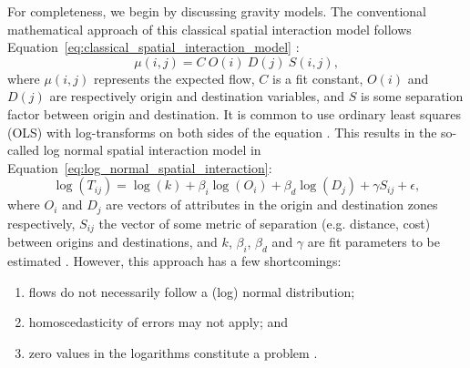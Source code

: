 For completeness, we begin by discussing gravity models. The conventional mathematical approach of this classical spatial interaction model follows Equation~\ref{eq:classical_spatial_interaction_model} \citep{LeSage2010SpatialFlows}:
\begin{equation}\label{eq:classical_spatial_interaction_model}
\mu(i,j) = C\ O(i)\ D(j)\ S(i,j) ,
\end{equation}
where $\mu(i,j)$ represents the expected flow, $C$ is a fit constant, $O(i)$ and $D(j)$ are respectively origin and destination variables, and $S$ is some separation factor between origin and destination. It is common to use ordinary least squares (OLS) with log-transforms on both sides of the equation \citep{Fotheringham1989SpatialApplications, Flowerdew1982ADISTRIBUTION}. This results in the so-called log normal spatial interaction model in Equation~\ref{eq:log_normal_spatial_interaction}:
\begin{equation}\label{eq:log_normal_spatial_interaction}
\log(T_{ij}) = \log(k) + \beta_i \log(O_i) + \beta_d \log(D_j) + \gamma  S_{ij} + \epsilon ,
\end{equation}
where $O_i$ and $D_j$ are vectors of attributes in the origin and destination zones respectively, $S_{ij}$ the vector of some metric of separation (e.g. distance, cost) between origins and destinations, and $k$, $\beta_i$, $\beta_d$ and $\gamma$ are fit parameters to be estimated \citep{Flowerdew1982ADISTRIBUTION}. However, this approach has a few shortcomings: 
\begin{enumerate}
\item flows do not necessarily follow a (log) normal distribution; 
\item homoscedasticity of errors may not apply; and 
\item zero values in the logarithms constitute a problem \citep{Fotheringham1989SpatialApplications}. 
\end{enumerate}

